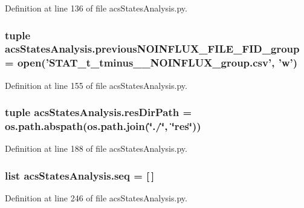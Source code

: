 Definition at line 136 of file acs\-States\-Analysis.\-py.

\hypertarget{a00130_a648b56a19ba8992cdb56d307ed22eb41}{
\subsubsection[{previous\-N\-O\-I\-N\-F\-L\-U\-X\-\_\-\-F\-I\-L\-E\-\_\-\-F\-I\-D\-\_\-group}]{\setlength{\rightskip}{0pt plus 5cm}tuple acs\-States\-Analysis.\-previous\-N\-O\-I\-N\-F\-L\-U\-X\-\_\-\-F\-I\-L\-E\-\_\-\-F\-I\-D\-\_\-group = open('S\-T\-A\-T\-\_\-t\-\_\-tminus\-\_\-\_\-\-N\-O\-I\-N\-F\-L\-U\-X\-\_\-group.\-csv', 'w')}}\label{a00130_a648b56a19ba8992cdb56d307ed22eb41}


Definition at line 155 of file acs\-States\-Analysis.\-py.

\hypertarget{a00130_ab3da7da39258338965b6eef645a913ee}{
\subsubsection[{res\-Dir\-Path}]{\setlength{\rightskip}{0pt plus 5cm}tuple acs\-States\-Analysis.\-res\-Dir\-Path = os.\-path.\-abspath(os.\-path.\-join(\char`\"{}./\char`\"{}, \char`\"{}res\char`\"{}))}}\label{a00130_ab3da7da39258338965b6eef645a913ee}


Definition at line 188 of file acs\-States\-Analysis.\-py.

\hypertarget{a00130_a22eec19fcd0da474a136cfe97438ae3b}{
\subsubsection[{seq}]{\setlength{\rightskip}{0pt plus 5cm}list acs\-States\-Analysis.\-seq = \mbox{[}$\,$\mbox{]}}}\label{a00130_a22eec19fcd0da474a136cfe97438ae3b}


Definition at line 246 of file acs\-States\-Analysis.\-py.


